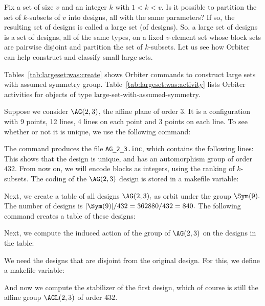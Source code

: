 Fix a set of size $v$ and an integer $k$ with $1 <k < v.$ 
Is it possible to partition the set of 
$k$-subsets of $v$ into designs, all with the same parameters? 
If so, the resulting set of designs is called a large set (of designs).
So, a large set of designs is a set of designs, all of the same types, 
on a fixed $v$-element set 
whose block sets are pairwise disjoint and partition the set of 
$k$-subsets. 
Let us see how Orbiter can help construct and classify small large sets.


Tables~\ref{tab:largeset:was:create} shows Orbiter 
commands to construct large sets with assumed symmetry group.
Table~\ref{tab:largeset:was:activity} lists Orbiter activities for 
objects of type large-set-with-assumed-symmetry.

\bigskip

Suppose we consider $\AG(2,3)$, 
the affine plane of order 3. 
It is a configuration with 9 points, 12 lines, 4 lines on each point and 3 points on each line.
To see whether or not it is unique, 
we use the following command:


The command produces the file \verb'AG_2_3.inc', which contains the following lines:
This shows that the design is unique, 
and has an automorphism group of order $432$.
From now on, we will encode blocks as integers, 
using the ranking of $k$-subsets.
The coding of the $\AG(2,3)$ design is stored in a makefile variable:



Next, we create a table of all designs $\AG(2,3),$ 
as orbit under the group $\Sym(9).$
The number of designs is $|\Sym(9)|/432 = 362880/432 = 840.$
The following command creates a table of these designs:



Next, we compute the induced action of the group of $\AG(2,3)$ on the designs in the table:


We need the designs that are disjoint from the original design. 
For this, we define a makefile variable:



And now we compute the stabilizer of the first design, 
which of course is still the affine group $\AGL(2,3)$ of order 432.


